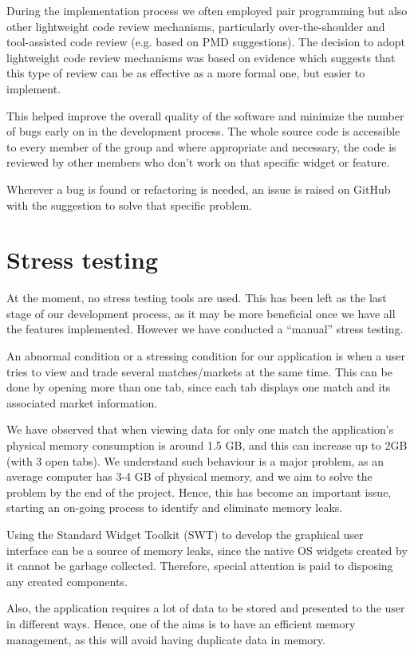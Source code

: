 \documentclass[10pt]{report}
\begin{document}
During the implementation process we often employed pair programming but also other lightweight code review mechanisms, particularly over-the-shoulder and tool-assisted code review (e.g. based on PMD suggestions). The decision to adopt lightweight code review mechanisms was based on evidence which suggests that this type of review can be as effective as a more formal one, but easier to implement.

This helped improve the overall quality of the software and minimize the number of bugs early on in the development process. The whole source code is accessible to every member of the group and where appropriate and necessary, the code is reviewed by other members who don’t work on that specific widget or feature. 

Wherever a bug is found or refactoring is needed, an issue is raised on GitHub with the suggestion to solve that specific problem.

\section{Stress testing}

At the moment, no stress testing tools are used. This has been left as the last stage of our development process, as it may be more beneficial once we have all the features implemented. However we have conducted a ``manual'' stress  testing.

An abnormal condition or a stressing condition for our application is when a user tries to view and trade several matches/markets at the same time. This can be done by opening more than one tab, since each tab displays one match and its associated market information.

We have observed that when viewing data for only one match the application’s physical memory consumption is around 1.5 GB, and this can increase up to 2GB (with 3 open tabs). We understand such behaviour is a major problem, as an average computer has 3-4 GB of physical memory, and we aim to solve the problem by the end of the project. Hence, this has become an important issue, starting an on-going process to identify and eliminate memory leaks.

Using the Standard Widget Toolkit (SWT) to develop the graphical user interface can be a source of memory leaks, since the native OS widgets created by it cannot be garbage collected. Therefore, special attention is paid to disposing any created components.

Also, the application requires a lot of data to be stored and presented to the user in different ways. Hence, one of the aims is to have an efficient memory management, as this will avoid having duplicate data in memory.
\end{document}
